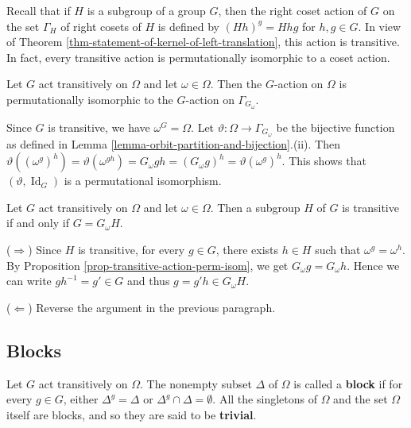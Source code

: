  Recall that if $H$ is a subgroup of  a group $G$, then the right coset action of $G$ on the set $\Gamma_H$ of right cosets of $H$  is defined by $(Hh)^g  = Hhg$ for $h,g\in G$. In view of Theorem \ref{thm-statement-of-kernel-of-left-translation}, this action is transitive. In fact, every transitive action is permutationally isomorphic to a coset action. 
\begin{proposition} \label{prop-transitive-action-perm-isom}
	Let $G$ act transitively on $\Omega$ and let $\omega\in \Omega$. Then the $G$-action on $\Omega$ is permutationally isomorphic to the $G$-action on $\Gamma_{G_\omega}$.
\end{proposition}
\begin{sketch}
	Since $G$ is transitive, we have $\omega^G = \Omega$. Let $\vartheta:\Omega \rightarrow \Gamma_{G_\omega}$ be the bijective function as defined in Lemma \ref{lemma-orbit-partition-and-bijection}.(ii). Then $\vartheta((\omega^g)^h) = \vartheta(\omega^{gh}) = G_\omega gh = (G_\omega g)^h = \vartheta(\omega^g)^h$. This shows that $(\vartheta,\operatorname{Id}_G)$ is a permutational isomorphism.
\end{sketch}

\begin{corollary}
	Let $G$ act transitively on $\Omega$ and let $\omega\in\Omega$. Then a subgroup $H$ of $G$ is transitive if and only if $G = G_\omega H$.
\end{corollary}
\begin{sketch}
	($\Rightarrow$) Since $H$ is transitive, for every $g\in G$, there exists $h\in H$ such that $\omega^g = \omega^h$. By Proposition \ref{prop-transitive-action-perm-isom}, we get $G_\omega g = G_\omega h$. Hence we can write $gh^{-1} = g'\in G$ and thus $g = g'h\in G_\omega H$.
	
	($\Leftarrow$) Reverse the argument in the previous paragraph.
\end{sketch}

\subsection{Blocks}
\begin{definition}
	Let $G$ act transitively on $\Omega$. The nonempty subset $\Delta$ of $\Omega$ is called a \textbf{block} if for every $g\in G$, either $\Delta^g=\Delta$ or $\Delta^g \cap \Delta = \emptyset$. All the singletons of $\Omega$ and the set $\Omega$ itself are blocks, and so they are said to be \textbf{trivial}.
\end{definition}



